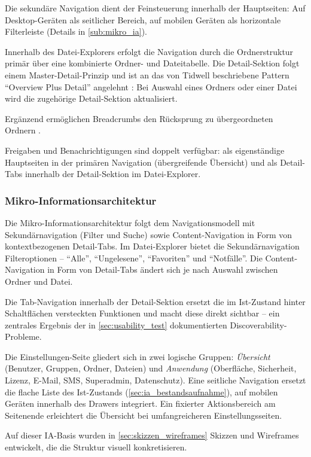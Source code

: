 Die sekundäre Navigation dient der Feinsteuerung innerhalb der Hauptseiten: Auf Desktop-Geräten als seitlicher Bereich, auf mobilen Geräten als horizontale Filterleiste (Details in \autoref{sub:mikro_ia}).

Innerhalb des Datei-Explorers erfolgt die Navigation durch die Ordnerstruktur primär über eine kombinierte Ordner- und Dateitabelle. Die Detail-Sektion folgt einem Master-Detail-Prinzip und ist an das von Tidwell beschriebene Pattern \enquote{Overview Plus Detail} angelehnt \parencite[Kap.~\enquote{Overview Plus Detail}]{tidwellDesigningInterfaces2011}: Bei Auswahl eines Ordners oder einer Datei wird die zugehörige Detail-Sektion aktualisiert.

Ergänzend ermöglichen Breadcrumbs den Rücksprung zu übergeordneten Ordnern \parencite[Kap.~15.1.4]{erlhoferWebsiteKonzeptionUndRelaunch2017}.

Freigaben und Benachrichtigungen sind doppelt verfügbar: als eigenständige Hauptseiten in der primären Navigation (übergreifende Übersicht) und als Detail-Tabs innerhalb der Detail-Sektion im Datei-Explorer.

\subsubsection{Mikro-Informationsarchitektur}\label{sub:mikro_ia}

Die Mikro-Informationsarchitektur folgt dem Navigationsmodell mit Sekundärnavigation (Filter und Suche) sowie Content-Navigation in Form von kontextbezogenen Detail-Tabs. Im Datei-Explorer bietet die Sekundärnavigation Filteroptionen -- \enquote{Alle}, \enquote{Ungelesene}, \enquote{Favoriten} und \enquote{Notfälle}. Die Content-Navigation in Form von Detail-Tabs ändert sich je nach Auswahl zwischen Ordner und Datei.

Die Tab-Navigation innerhalb der Detail-Sektion ersetzt die im Ist-Zustand hinter Schaltflächen versteckten Funktionen und macht diese direkt sichtbar -- ein zentrales Ergebnis der in \autoref{sec:usability_test} dokumentierten Discoverability-Probleme.

Die Einstellungen-Seite gliedert sich in zwei logische Gruppen: \textit{Übersicht} (Benutzer, Gruppen, Ordner, Dateien) und \textit{Anwendung} (Oberfläche, Sicherheit, Lizenz, E-Mail, SMS, Superadmin, Datenschutz). Eine seitliche Navigation ersetzt die flache Liste des Ist-Zustands (\autoref{sec:ia_bestandsaufnahme}), auf mobilen Geräten innerhalb des Drawers integriert. Ein fixierter Aktionsbereich am Seitenende erleichtert die Übersicht bei umfangreicheren Einstellungsseiten.

Auf dieser IA-Basis wurden in \autoref{sec:skizzen_wireframes} Skizzen und Wireframes entwickelt, die die Struktur visuell konkretisieren.
